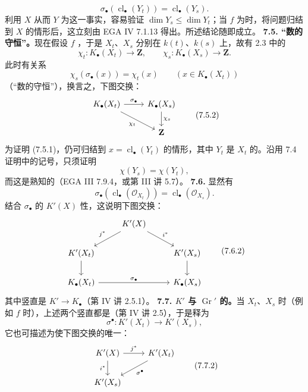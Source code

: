 \[\sigma_\bullet(\operatorname{cl}_\bullet(Y_t))=\operatorname{cl}_\bullet(Y_s).\]
利用 $X$ 从而 $Y$ 为这一事实，容易验证 $\dim Y_s\leq\dim Y_t$；当 $f$ 为时，将问题归结到 $X$ 的情形后，这立刻由 EGA IV 7.1.13 得出。所述结论随即成立。
\textbf{7.5. “数的守恒”。}现在假设 $f$ ，于是 $X_t$、$X_s$ 分别在 $k(t)$、$k(s)$ 上，故有 2.3 中的
\[\chi_t:K_\bullet(X_t)\to\mathbf Z,\qquad\chi_s:K_\bullet(X_s)\to\mathbf Z.\]
此时有关系
\[\chi_s(\sigma_\bullet(x))=\chi_t(x)\qquad(x\in K_\bullet(X_t))\tag{7.5.1}\]
（“数的守恒”），换言之，下图交换：
\[\begin{tikzcd}K_\bullet(X_t)\arrow[r,"\sigma_\bullet"]\arrow[dr,"\chi_t"']&K_\bullet(X_s)\arrow[d,"\chi_s"]\\&\mathbf Z\end{tikzcd}\tag{7.5.2}\]
为证明 (7.5.1)，仍可归结到 $x=\operatorname{cl}_\bullet(Y_t)$ 的情形，其中 $Y_t$ 是 $X_t$ 的。沿用 7.4 证明中的记号，只须证明
\[\chi(Y_s)=\chi(Y_t),\]
而这是熟知的（EGA III 7.9.4，或第 III 讲 5.7）。
\textbf{7.6.} 显然有
\[\sigma_\bullet(\operatorname{cl}_\bullet(\mathcal O_{X_t}))=\operatorname{cl}_\bullet(\mathcal O_{X_s}).\tag{7.6.1}\]
结合 $\sigma_\bullet$ 的 $K'(X)$ 性，这说明下图交换：
\[\begin{tikzcd}&K'(X)\arrow[dl,"j^*"']\arrow[dr,"i^*"]&\\K'(X_t)\arrow[d]&&K'(X_s)\arrow[d]\\K_\bullet(X_t)\arrow[rr,"\sigma_\bullet"]&&K_\bullet(X_s)\end{tikzcd}\tag{7.6.2}\]
其中竖直是 $K'\to K_\bullet$（第 IV 讲 2.5.1）。
\textbf{7.7. $K'$ 与 $\operatorname{Gr}'$ 的。}当 $X_t$、$X_s$ 时（例如 $f$ 时），上述两个竖直都是（第 IV 讲 2.5），于是释为
\[\sigma^\bullet:K'(X_t)\longrightarrow K'(X_s),\tag{7.7.1}\]
它也可描述为使下图交换的唯一：
\[\begin{tikzcd}K'(X)\arrow[r,"j^*"]\arrow[d,"i^*"']&K'(X_t)\arrow[dl,"\sigma^\bullet"]\\K'(X_s)&\end{tikzcd}\tag{7.7.2}\]

